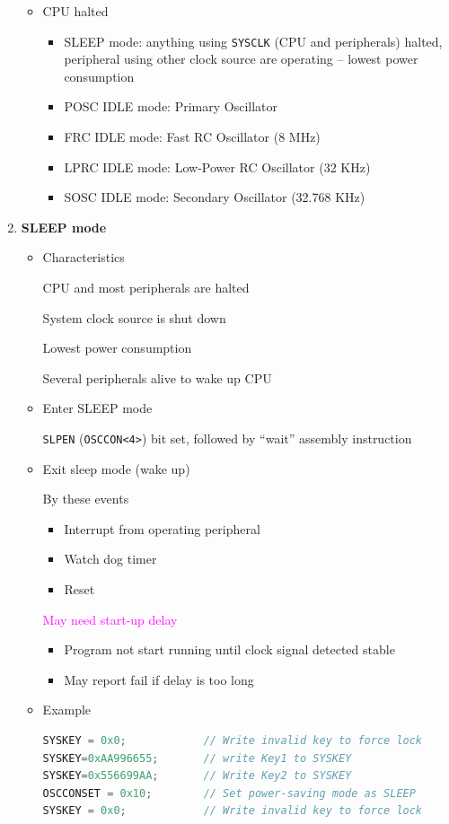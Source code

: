 \documentclass[a4paper]{article}
\begin{document}
\begin{enumerate}[label = \arabic*.]
\begin{itemize}[leftmargin = 1cm]
        \item CPU halted
          \begin{itemize}[leftmargin = 1cm]
            \item SLEEP mode: anything using \verb|SYSCLK| (CPU and peripherals) halted, peripheral using other clock source are operating – lowest power consumption
            \item POSC IDLE mode: Primary Oscillator
            \item FRC IDLE mode: Fast RC Oscillator (8 MHz)
            \item LPRC IDLE mode: Low-Power RC Oscillator (32 KHz)
            \item SOSC IDLE mode: Secondary Oscillator (32.768 KHz)
          \end{itemize}
      \end{itemize}

    \item \textbf{SLEEP mode}
      \begin{itemize}[leftmargin = 1cm]
        \item Characteristics
          \par CPU and most peripherals are halted
          \par System clock source is shut down
          \par Lowest power consumption
          \par Several peripherals alive to wake up CPU
        \item Enter SLEEP mode
          \par \verb|SLPEN| (\verb|OSCCON<4>|) bit set, followed by “wait” assembly instruction
        \item Exit sleep mode (wake up)
          \par By these events
          \begin{itemize}[leftmargin = 1cm]
            \item Interrupt from operating peripheral
            \item Watch dog timer
            \item Reset
          \end{itemize}
          \par \textcolor{magenta}{May need start-up delay}
          \begin{itemize}[leftmargin = 1cm]
            \item Program not start running until clock signal detected stable
            \item May report fail if delay is too long
          \end{itemize}
        \item Example
          \begin{lstlisting}[language=c]
SYSKEY = 0x0;            // Write invalid key to force lock
SYSKEY=0xAA996655;       // write Key1 to SYSKEY
SYSKEY=0x556699AA;       // Write Key2 to SYSKEY
OSCCONSET = 0x10;        // Set power-saving mode as SLEEP
SYSKEY = 0x0;            // Write invalid key to force lock


\end{lstlisting}
\end{itemize}
\end{enumerate}
\end{document}
